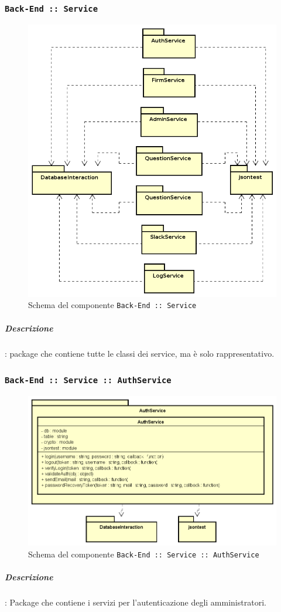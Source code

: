 \documentclass[../DefinizioneDiProdotto_v3.0.0.tex]{subfiles}
\begin{document}
\newpage
\subsubsection{\texttt{Back-End :: Service}}
\begin{figure}[!h]
	\centering
	\includegraphics[scale=0.7]{Architettura/Back-End/Service/Service.png}
	\caption{Schema del componente \texttt{Back-End :: Service}}
\end{figure}
\subparagraph{Descrizione}: package che contiene tutte le classi dei service, ma è solo rappresentativo.
\newpage
\subsubsection{\texttt{Back-End :: Service :: AuthService}}
\begin{figure}[!h]
	\centering
	\includegraphics[scale=0.7]{Architettura/Back-End/Service/AuthService.png}
	\caption{Schema del componente \texttt{Back-End :: Service :: AuthService}}
\end{figure}
\subparagraph{Descrizione}: Package che contiene i servizi per l'autenticazione degli amministratori.
\end{document}
